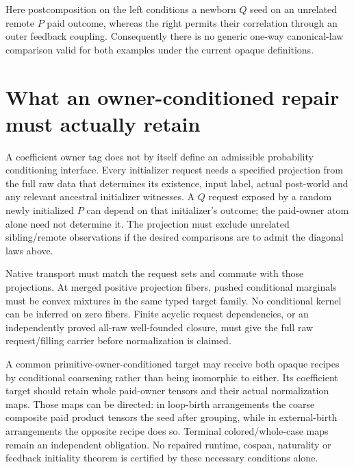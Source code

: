 \documentclass[11pt]{article}\usepackage{amsmath,amssymb,geometry}\geometry{margin=1in}
\begin{document}
Here postcomposition on the left conditions a newborn $Q$ seed on an unrelated remote $P$ paid outcome, whereas the right permits their correlation through an outer feedback coupling. Consequently there is no generic one-way canonical-law comparison valid for both examples under the current opaque definitions.

\section*{What an owner-conditioned repair must actually retain}
A coefficient owner tag does not by itself define an admissible probability conditioning interface. Every initializer request needs a specified projection from the full raw data that determines its existence, input label, actual post-world and any relevant ancestral initializer witnesses. A $Q$ request exposed by a random newly initialized $P$ can depend on that initializer's outcome; the paid-owner atom alone need not determine it. The projection must exclude unrelated sibling/remote observations if the desired comparisons are to admit the diagonal laws above.

Native transport must match the request sets and commute with those projections. At merged positive projection fibers, pushed conditional marginals must be convex mixtures in the same typed target family. No conditional kernel can be inferred on zero fibers. Finite acyclic request dependencies, or an independently proved all-raw well-founded closure, must give the full raw request/filling carrier before normalization is claimed.

A common primitive-owner-conditioned target may receive both opaque recipes by conditional coarsening rather than being isomorphic to either. Its coefficient target should retain whole paid-owner tensors and their actual normalization maps. Those maps can be directed: in loop-birth arrangements the coarse composite paid product tensors the seed after grouping, while in external-birth arrangements the opposite recipe does so. Terminal colored/whole-case maps remain an independent obligation. No repaired runtime, cospan, naturality or feedback initiality theorem is certified by these necessary conditions alone.
\end{document}
